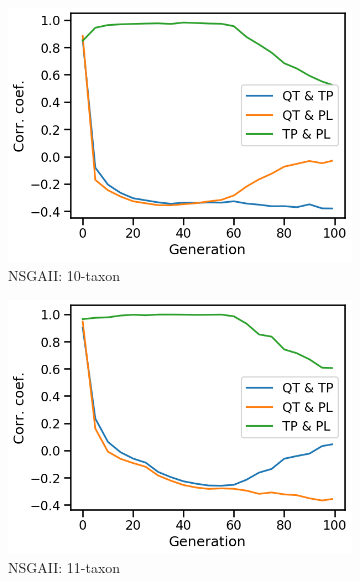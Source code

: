 \begin{figure}[!htbp]
	\centering
		\begin{subfigure}[b]{0.3\textwidth}
			\includegraphics[width=\textwidth]{Figure/10-taxon_NSGAII_corr_plot}
			\caption{NSGAII: 10-taxon}
		\end{subfigure}%
		\begin{subfigure}[b]{0.3\textwidth}
			\includegraphics[width=\textwidth]{Figure/11-taxon_NSGAII_corr_plot}
			\caption{NSGAII: 11-taxon}
		\end{subfigure}%
		\begin{subfigure}[b]{0.3\textwidth}

\end{subfigure}
\end{figure}
